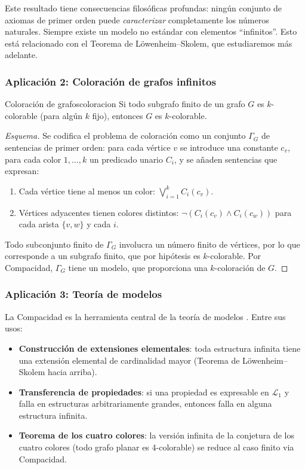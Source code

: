 \begin{importante}
Este resultado tiene consecuencias filosóficas profundas: ningún conjunto de axiomas de primer orden puede \emph{caracterizar} completamente los números naturales. Siempre existe un modelo no estándar con elementos ``infinitos''. Esto está relacionado con el Teorema de Löwenheim–Skolem, que estudiaremos más adelante.
\end{importante}

\subsubsection{Aplicación 2: Coloración de grafos infinitos}

\begin{corolario}{Coloración de grafos}{coloracion}
Si todo subgrafo finito de un grafo $G$ es $k$-colorable (para algún $k$ fijo), entonces $G$ es $k$-colorable.
\end{corolario}

\begin{proof}[Esquema]
Se codifica el problema de coloración como un conjunto $\Gamma_G$ de sentencias de primer orden: para cada vértice $v$ se introduce una constante $c_v$, para cada color $1,\ldots,k$ un predicado unario $C_i$, y se añaden sentencias que expresan:
\begin{enumerate}
  \item Cada vértice tiene al menos un color: $\bigvee_{i=1}^k C_i(c_v)$.
  \item Vértices adyacentes tienen colores distintos: $\neg(C_i(c_v) \wedge C_i(c_w))$ para cada arista $\{v,w\}$ y cada $i$.
\end{enumerate}

Todo subconjunto finito de $\Gamma_G$ involucra un número finito de vértices, por lo que corresponde a un subgrafo finito, que por hipótesis es $k$-colorable. Por Compacidad, $\Gamma_G$ tiene un modelo, que proporciona una $k$-coloración de $G$.
\end{proof}

\subsubsection{Aplicación 3: Teoría de modelos}

La Compacidad es la herramienta central de la teoría de modelos \cite{marker2002}. Entre sus usos:
\begin{itemize}
  \item \textbf{Construcción de extensiones elementales}: toda estructura infinita tiene una extensión elemental de cardinalidad mayor (Teorema de Löwenheim–Skolem hacia arriba).
  \item \textbf{Transferencia de propiedades}: si una propiedad es expresable en $\mathcal{L}_1$ y falla en estructuras arbitrariamente grandes, entonces falla en alguna estructura infinita.
  \item \textbf{Teorema de los cuatro colores}: la versión infinita de la conjetura de los cuatro colores (todo grafo planar es 4-colorable) se reduce al caso finito via Compacidad.
\end{itemize}

